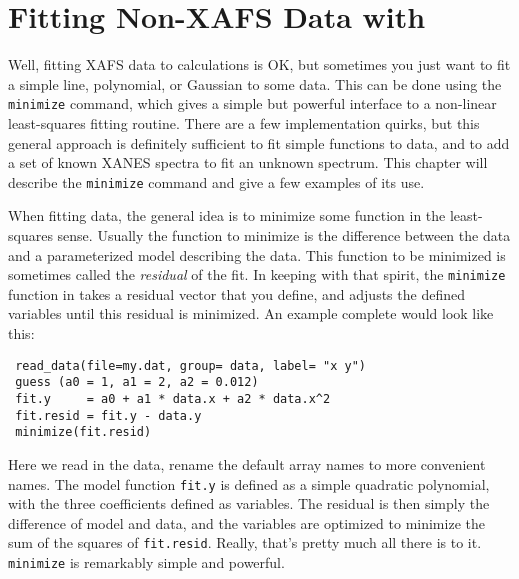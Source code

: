 \section{Fitting Non-XAFS Data with {\ifeffit}} \label{Ch:Minimize}

{}
Well, fitting XAFS data to {\feff} calculations is OK, but sometimes you
just want to fit a simple line, polynomial, or Gaussian to some data.  This
can be done using the {\texttt{minimize}} command, which gives a simple but
powerful interface to a non-linear least-squares fitting routine.  There
are a few implementation quirks, but this general approach is definitely
sufficient to fit simple functions to data, and to add a set of known XANES
spectra to fit an unknown spectrum.  This chapter will describe the
{\texttt{minimize}} command and give a few examples of its use.
{}

When fitting data, the general idea is to minimize some function in the
least-squares sense. Usually the function to minimize is the difference
between the data and a parameterized model describing the data.  This
function to be minimized is sometimes called the {\emph{residual}} of the
fit.  In keeping with that spirit, the {\tt{minimize}} function in
{\ifeffit} takes a residual vector that you define, and adjusts the defined
variables until this residual is minimized.  An example complete would look
like this:

{\small{
 \begin{Sbox}\begin{minipage}{5.00truein}
\begin{Verbatim}
 read_data(file=my.dat, group= data, label= "x y")
 guess (a0 = 1, a1 = 2, a2 = 0.012)
 fit.y     = a0 + a1 * data.x + a2 * data.x^2
 fit.resid = fit.y - data.y
 minimize(fit.resid)
\end{Verbatim}
 \end{minipage}\end{Sbox}\setlength{\fboxsep}{2mm}{%
 \begin{flushright}\shadowbox{\TheSbox}\end{flushright}}
}}\noindent
Here we read in the data, rename the default array names to more convenient
names.  The model function {\tt{fit.y}} is defined as a simple quadratic
polynomial, with the three coefficients defined as variables.  The residual
is then simply the difference of model and data, and the variables are
optimized to minimize the sum of the squares of {\texttt{fit.resid}}.
Really, that's pretty much all there is to it.  {\tt{minimize}} is
remarkably simple and powerful.


